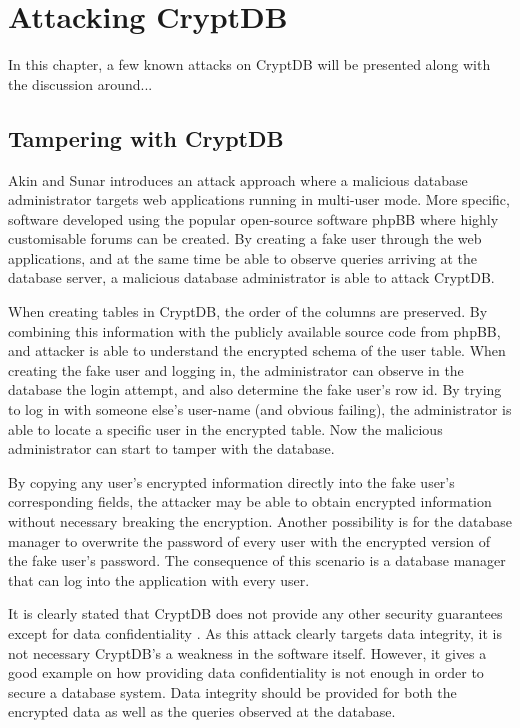\chapter{Attacking CryptDB}
\label{chp:attacks}

In this chapter, a few known attacks on CryptDB will be presented along with the discussion around...

\section{Tampering with CryptDB}

Akin and Sunar \cite{akin_2014} introduces an attack approach where a malicious database administrator targets web applications running in multi-user mode. More specific, software developed using the popular open-source software phpBB \cite{phpBB} where highly customisable forums can be created. By creating a fake user through the web applications, and at the same time be able to observe queries arriving at the database server, a malicious database administrator is able to attack CryptDB.

When creating tables in CryptDB, the order of the columns are preserved. By combining this information with the publicly available source code from phpBB, and attacker is able to understand the encrypted schema of the user table. When creating the fake user and logging in, the administrator can observe in the database the login attempt, and also determine the fake user's row id. By trying to log in with someone else's user-name (and obvious failing), the administrator is able to locate a specific user in the encrypted table. Now the malicious administrator can start to tamper with the database.

By copying any user's encrypted information directly into the fake user's corresponding fields, the attacker may be able to obtain encrypted information without necessary breaking the encryption. Another possibility is for the database manager to overwrite the password of every user with the encrypted version of the fake user's password. The consequence of this scenario is a database manager that can log into the application with every user.


It is clearly stated that CryptDB does not provide any other security guarantees except for data confidentiality \cite{CryptDB_Main_Paper}. As this attack clearly targets data integrity, it is not necessary CryptDB's a weakness in the software itself. However, it gives a good example on how providing data confidentiality is not enough in order to secure a database system. Data integrity should be provided for both the encrypted data as well as the queries observed at the database.

